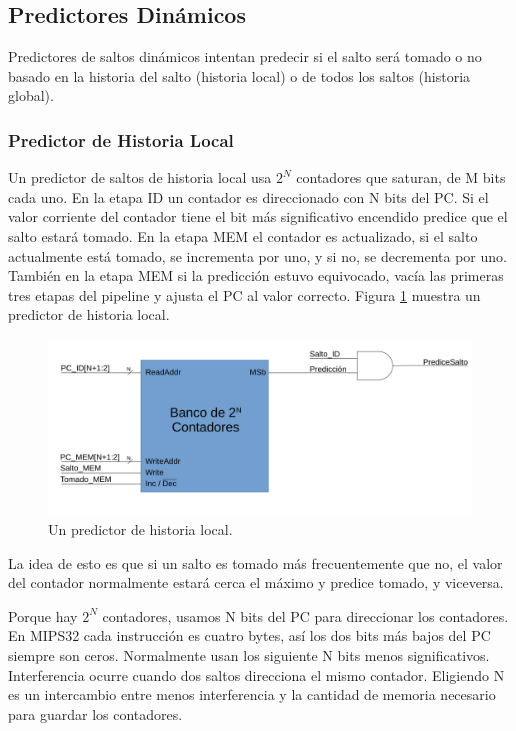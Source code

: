 \documentclass[a4paper]{article}
\begin{document}
\subsection{Predictores Dinámicos}

Predictores de saltos dinámicos intentan predecir si el salto será tomado o no basado en la historia del salto (historia local) o de todos los saltos (historia global).

\subsubsection{Predictor de Historia Local}

Un predictor de saltos de historia local usa $2^N$ contadores que saturan, de M bits cada uno. En la etapa ID un contador es direccionado con N bits del PC. Si el valor corriente del contador tiene el bit más significativo encendido predice que el salto estará tomado. En la etapa MEM el contador es actualizado, si el salto actualmente está tomado, se incrementa por uno, y si no, se decrementa por uno. También en la etapa MEM si la predicción estuvo equivocado, vacía las primeras tres etapas del pipeline y ajusta el PC al valor correcto. Figura \ref{fig:local_history} muestra un predictor de historia local.

\begin{figure}[!htb]
\centering
\includegraphics[scale=0.4]{./img/local_history}
\caption{Un predictor de historia local.}
\label{fig:local_history}
\end{figure}

La idea de esto es que si un salto es tomado más frecuentemente que no, el valor del contador normalmente estará cerca el máximo y predice tomado, y viceversa.

Porque hay $2^N$ contadores, usamos N bits del PC para direccionar los contadores. En MIPS32 cada instrucción es cuatro bytes, así los dos bits más bajos del PC siempre son ceros. Normalmente usan los siguiente N bits menos significativos. Interferencia ocurre cuando dos saltos direcciona el mismo contador. Eligiendo N es un intercambio entre menos interferencia y la cantidad de memoria necesario para guardar los contadores.
\end{document}
